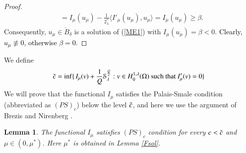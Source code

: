 \documentclass[12pt, notitlepage]{article}
\newtheorem{lem}[theorem]{Lemma}
\begin{document}
{\begin{proof}
\begin{align}
    &=I_\mu(u_\mu)-\frac{1}{2^*_\lambda}\langle I'_\mu(u_\mu),u_\mu\rangle= I_\mu(u_\mu)\geq \beta.
\end{align}
Consequently, $u_\mu\in\mathring{B}_\delta$ is a solution of (\ref{ME1}) with $I_\mu(u_\mu)=\beta<0.$ \textcolor{black}{Clearly, $u_\mu\not\equiv 0$, otherwise $\beta=0$.}
\end{proof}
We define 
\begin{align}\label{d1}
    \Tilde{c}=\inf\{\, I_\mu(v)+\frac{1}{Q}\mathcal{S}_\lambda^\frac{Q}{2}: v\in H^{1,\lambda}_0(\Omega) \text{ such that } I'_\mu(v)=0 \}
\end{align}
We will prove that the functional $I_\mu$ satisfies the Palais-Smale condition (abbreviated as $(PS)_c$) below the level $\Tilde{c}$, and here we use the argument of Brezis and Nirenberg \cite{BN}. 
\begin{lem}\label{BrezisNiren1}
     The functional $I_\mu$ satisfies $(PS)_c$ condition for every $c<\Tilde{c}$ and $\mu\in(0,\mu^*)$. Here $\mu^*$ is obtained in Lemma \ref{Fsol}.
\end{lem}

}
\end{document}
